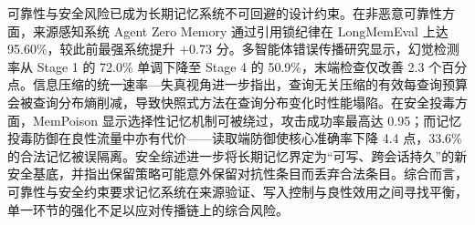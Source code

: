 可靠性与安全风险已成为长期记忆系统不可回避的设计约束。在非恶意可靠性方面，来源感知系统 Agent Zero Memory 通过引用锁纪律在 LongMemEval 上达 95.60\%，较此前最强系统提升 +0.73 分\cite{W0010}。多智能体错误传播研究显示，幻觉检测率从 Stage 1 的 72.0\% 单调下降至 Stage 4 的 50.9\%，末端检查仅改善 2.3 个百分点\cite{W0688}。信息压缩的统一速率—失真视角进一步指出，查询无关压缩的有效每查询预算会被查询分布熵削减，导致快照式方法在查询分布变化时性能塌陷\cite{W0207}。在安全投毒方面，MemPoison 显示选择性记忆机制可被绕过，攻击成功率最高达 0.95\cite{W0319}；而记忆投毒防御在良性流量中亦有代价——读取端防御使核心准确率下降 4.4 点，33.6\% 的合法记忆被误隔离\cite{W0312}。安全综述进一步将长期记忆界定为“可写、跨会话持久”的新安全基底，并指出保留策略可能意外保留对抗性条目而丢弃合法条目\cite{W0039}。综合而言，可靠性与安全约束要求记忆系统在来源验证、写入控制与良性效用之间寻找平衡，单一环节的强化不足以应对传播链上的综合风险\cite{W0010,W0312,W0039,W0688}。


